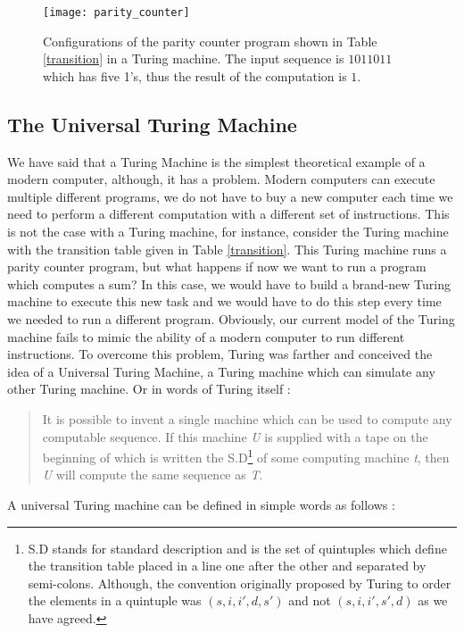 \begin{figure}
	\centering
		\texttt{[image: parity\_counter]}
	\caption[A parity counter executed by a Turing machine.]{Configurations of the parity counter program shown in Table \ref{transition} in a Turing machine. The input sequence is $1011011$ which has five 1's, thus the result of the computation is $1$.}
	\label{fig:turing_machine}
\end{figure}

\subsection{The Universal Turing Machine}
We have said that a Turing Machine is the simplest theoretical example of a modern computer, although, it has a problem. Modern computers can execute multiple different programs, we do not have to buy a new computer each time we need to perform a different computation with a different set of instructions. This is not the case with a Turing machine, for instance, consider the Turing machine with the transition table given in Table \ref{transition}. This Turing machine runs a parity counter program, but what happens if now we want to run a program which computes a sum? In this case, we would have to build a brand-new Turing machine to execute this new task and we would have to do this step every time we needed to run a different program. Obviously, our current model of the Turing machine fails to mimic the ability of a modern computer to run different instructions. To overcome this problem, Turing was farther and conceived the idea of a Universal Turing Machine, a Turing machine which can simulate any other Turing machine. Or in words of Turing itself \cite{turing1936}:

\begin{quote}
It is possible to invent a single machine which can be used to compute any computable sequence. If this machine \textit{U} is supplied with a tape on the beginning of which is written the S.D\footnote{S.D stands for standard description and is the set of quintuples which define the transition table placed in a line one after the other and separated by semi-colons. Although, the convention originally proposed by Turing to order the elements in a quintuple was $(s,i,i',d,s')$ and not $(s,i,i',s',d)$ as we have agreed.} of some computing machine \textit{t}, then \textit{U} will compute the same sequence as \textit{T}.
\end{quote}

A universal Turing machine can be defined in simple words as follows \cite{utm}:

